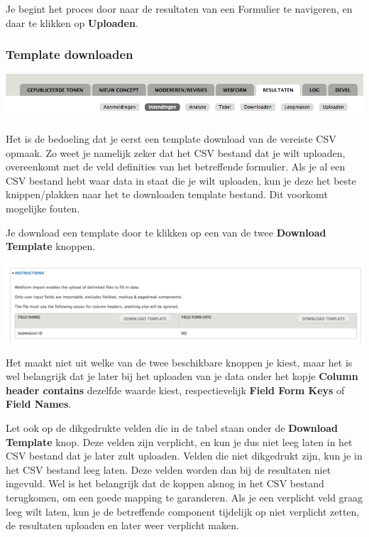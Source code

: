 Je begint het proces door naar de resultaten van een Formulier te navigeren, en daar te klikken op \textbf{Uploaden}.

\subsubsection{Template downloaden}

\includegraphics[width=\textwidth]{img/webform-upload.png}

Het is de bedoeling dat je eerst een template download van de vereiste CSV opmaak. Zo weet je namelijk zeker dat het CSV bestand dat je wilt uploaden, overeenkomt met de veld definities van het betreffende formulier. Als je al een CSV bestand hebt waar data in staat die je wilt uploaden, kun je deze het beste knippen/plakken naar het te downloaden template bestand. Dit voorkomt mogelijke fouten.

Je download een template door te klikken op een van de twee \textbf{Download Template} knoppen.

\includegraphics[width=\textwidth]{img/webform-template.png}

Het maakt niet uit welke van de twee beschikbare knoppen je kiest, maar het is wel belangrijk dat je later bij het uploaden van je data onder het kopje \textbf{Column header contains} dezelfde waarde kiest, respectievelijk \textbf{Field Form Keys} of \textbf{Field Names}.

Let ook op de dikgedrukte velden die in de tabel staan onder de \textbf{Download Template} knop. Deze velden zijn verplicht, en kun je dus niet leeg laten in het CSV bestand dat je later zult uploaden.
Velden die niet dikgedrukt zijn, kun je in het CSV bestand leeg laten. Deze velden worden dan bij de resultaten niet ingevuld. Wel is het belangrijk dat de koppen alsnog in het CSV bestand terugkomen, om een goede mapping te garanderen. Als je een verplicht veld graag leeg wilt laten, kun je de betreffende component tijdelijk op niet verplicht zetten, de resultaten uploaden en later weer verplicht maken.

